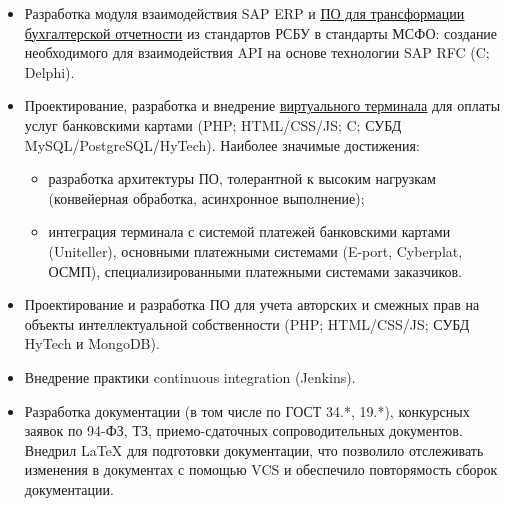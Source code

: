 {\begin{itemize}
  \begin{itemize}
    \item успешный запуск системы в промышленную эксплуатацию в крайне сжатые сроки: от проектирования до запуска прошло меньше двух месяцев;
    \item адаптация системы под высокие нагрузки (конвейерная обработка, асинхронное выполнение, горизонтальное масштабирование, шардинг, партицирование, денормализация, оптимизация запросов).
  \end{itemize}
  \item Разработка модуля взаимодействия SAP ERP и \href{http://www.openinfotech.ru/index.php?service=4&subs=11}{\underline{ПО для трансформации бухгалтерской отчетности}} из стандартов РСБУ в стандарты МСФО: создание необходимого для взаимодействия API на основе технологии SAP RFC (C; Delphi).	
  \item Проектирование, разработка и внедрение \href{http://www.openinfotech.ru/index.php?service=4&subs=10}{\underline{виртуального терминала}} для оплаты услуг банковскими картами (PHP; HTML/CSS/JS; C; СУБД MySQL/PostgreSQL/HyTech). Наиболее значимые достижения:
  \begin{itemize}
    \item разработка архитектуры ПО, толерантной к высоким нагрузкам (конвейерная обработка, асинхронное выполнение);
    \item интеграция терминала с системой платежей банковскими картами (Uniteller), основными платежными системами (E-port, Cyberplat, ОСМП), специализированными платежными системами заказчиков.
  \end{itemize}
\item Проектирование и разработка ПО для учета авторских и смежных прав на объекты интеллектуальной собственности (PHP; HTML/CSS/JS; СУБД HyTech и MongoDB).
\item Внедрение практики continuous integration (Jenkins).
\item Разработка документации (в том числе по ГОСТ 34.*, 19.*), конкурсных заявок по 94-ФЗ, ТЗ, приемо-сдаточных сопроводительных документов. Внедрил LaTeX для подготовки документации, что позволило отслеживать изменения в документах с помощью VCS и обеспечило повторямость сборок документации.
\end{itemize}}

